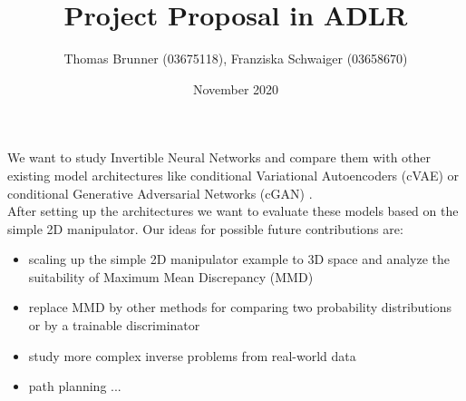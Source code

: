 \documentclass[12pt]{extarticle}
\title{Project Proposal in ADLR}
\author{Thomas Brunner (03675118), Franziska Schwaiger (03658670)}
\date{November 2020}
\begin{document}
\maketitle

We want to study Invertible Neural Networks \cite{Ardizzone2018} and compare them with other existing model architectures like conditional Variational Autoencoders (cVAE) \cite{Sohn2015} or conditional Generative Adversarial Networks (cGAN) \cite{Mehdi2018}.\\

After setting up the architectures we want to evaluate these models based on the simple 2D manipulator.
Our ideas for possible future contributions are:

\begin{itemize}
    \item scaling up the simple 2D manipulator example to 3D space and analyze the suitability of Maximum Mean Discrepancy (MMD) \cite{Gretton2008}
    \item replace MMD by other methods for comparing two probability distributions or by a trainable discriminator
    \item study more complex inverse problems from real-world data
    \item path planning ...
\end{itemize}



\end{document}
